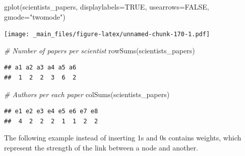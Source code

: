 \documentclass[
  notitlepage,
  onecolumn,
  openany]{book}
\newenvironment{Shaded}{\begin{snugshade}}{\end{snugshade}}
\newcommand{\AttributeTok}[1]{\textcolor[rgb]{0.77,0.63,0.00}{#1}}
\newcommand{\CommentTok}[1]{\textcolor[rgb]{0.56,0.35,0.01}{\textit{#1}}}
\newcommand{\ConstantTok}[1]{\textcolor[rgb]{0.00,0.00,0.00}{#1}}
\newcommand{\FunctionTok}[1]{\textcolor[rgb]{0.00,0.00,0.00}{#1}}
\newcommand{\NormalTok}[1]{#1}
\newcommand{\StringTok}[1]{\textcolor[rgb]{0.31,0.60,0.02}{#1}}
\begin{document}
\begin{Shaded}
\begin{Highlighting}[]
\FunctionTok{gplot}\NormalTok{(scientists\_papers, }\AttributeTok{displaylabels=}\ConstantTok{TRUE}\NormalTok{, }\AttributeTok{usearrows=}\ConstantTok{FALSE}\NormalTok{, }\AttributeTok{gmode=}\StringTok{"twomode"}\NormalTok{)}
\end{Highlighting}
\end{Shaded}

\texttt{[image: \_main\_files/figure-latex/unnamed-chunk-170-1.pdf]}

\begin{Shaded}
\begin{Highlighting}[]
\CommentTok{\# Number of papers per scientist}
\FunctionTok{rowSums}\NormalTok{(scientists\_papers)}
\end{Highlighting}
\end{Shaded}

\begin{verbatim}
## a1 a2 a3 a4 a5 a6 
##  1  2  2  3  6  2
\end{verbatim}

\begin{Shaded}
\begin{Highlighting}[]
\CommentTok{\# Authors per each paper}
\FunctionTok{colSums}\NormalTok{(scientists\_papers)}
\end{Highlighting}
\end{Shaded}

\begin{verbatim}
## e1 e2 e3 e4 e5 e6 e7 e8 
##  4  2  2  2  1  1  2  2
\end{verbatim}

The following example instead of inserting 1s and 0s contains weights, which represent the strength of the link between a node and another.
\end{document}
